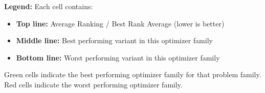 \documentclass{article}
\begin{document}
\vspace{0.5em}
\textbf{Legend:} Each cell contains:
\begin{itemize}
\item \textbf{Top line:} Average Ranking / Best Rank Average (lower is better)
\item \textbf{Middle line:} Best performing variant in this optimizer family
\item \textbf{Bottom line:} Worst performing variant in this optimizer family
\end{itemize}
\textcolor{bestgreen}{Green cells} indicate the best performing optimizer family for that problem family.
\textcolor{worstred}{Red cells} indicate the worst performing optimizer family.
\end{document}
